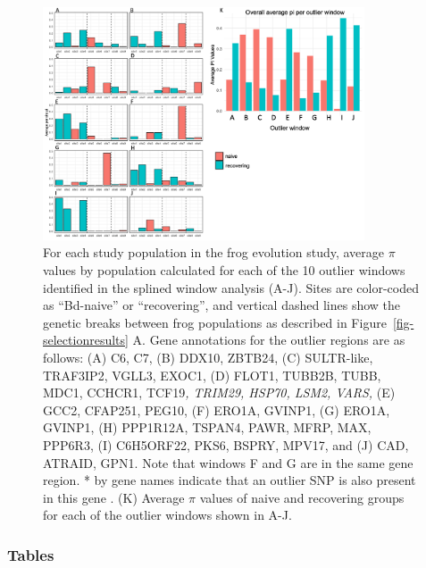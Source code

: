 \documentclass[9pt,twoside,lineno]{pnas-new}
\begin{document}
\begin{figure}

{\centering \includegraphics[width=0.85\textwidth]{figures/perwindow_persite_pi.png}

}

\caption{\label{fig-barchart-pi-by-windowsite}For each study population
in the frog evolution study, average \(\pi\) values by population
calculated for each of the 10 outlier windows identified in the splined
window analysis (A-J). Sites are color-coded as ``Bd-naive'' or
``recovering'', and vertical dashed lines show the genetic breaks
between frog populations as described in
Figure~\ref{fig-selectionresults} A. Gene annotations for the outlier
regions are as follows: (A) C6, C7, (B) DDX10, ZBTB24, (C) SULTR-like,
TRAF3IP2, VGLL3, EXOC1, (D) FLOT1, TUBB2B, TUBB, MDC1, CCHCR1,
TCF19\emph{, TRIM29, HSP70, LSM2, VARS,} (E) GCC2, CFAP251, PEG10, (F)
ERO1A, GVINP1, (G) ERO1A, GVINP1, (H) PPP1R12A, TSPAN4, PAWR, MFRP, MAX,
PPP6R3, (I) C6H5ORF22, PKS6, BSPRY, MPV17, and (J) CAD, ATRAID, GPN1.
Note that windows F and G are in the same gene region. * by gene names
indicate that an outlier SNP is also present in this gene . (K) Average
\(\pi\) values of naive and recovering groups for each of the outlier
windows shown in A-J. }

\end{figure}\clearpage

\newpage

\hypertarget{tables}{%
\subsubsection{Tables}\label{tables}}
\end{document}
